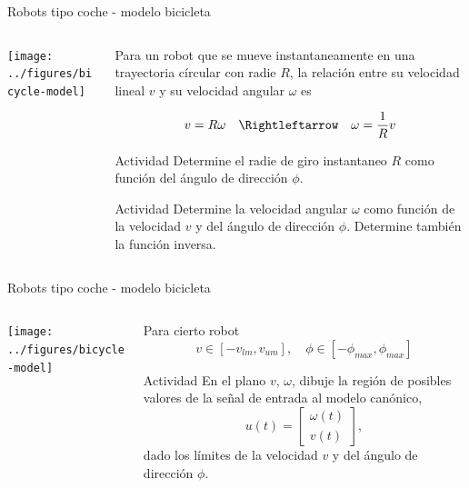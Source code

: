 \documentclass[presentation,aspectratio=169]{beamer}
\begin{document}
\begin{frame}[label={sec:orgb0b4836}]{Robots tipo coche - modelo bicicleta}
\begin{columns}
\begin{column}{0.4\columnwidth}
\begin{center}
 \texttt{[image: ../figures/bicycle-model]}
\end{center}
\end{column}

\begin{column}{0.6\columnwidth}
\pause

Para un robot que se mueve instantaneamente en una trayectoria círcular con radie \(R\), la relación entre su velocidad lineal \(v\) y su velocidad angular \(\omega\) es

\pause

\[ v = R\omega \quad \Rightleftarrow \quad \omega = \frac{1}{R} v \]

\pause
\alert{Actividad} Determine el radie de giro instantaneo \(R\) como función del ángulo de dirección \(\phi\).

\pause
\alert{Actividad} Determine la velocidad angular \(\omega\) como función de la velocidad \(v\) y del ángulo de dirección \(\phi\). Determine también la función inversa.
\end{column}
\end{columns}
\end{frame}



\begin{frame}[label={sec:org7fbcf45}]{Robots tipo coche - modelo bicicleta}
\begin{columns}
\begin{column}{0.4\columnwidth}
\begin{center}
 \texttt{[image: ../figures/bicycle-model]}
\end{center}
\end{column}

\begin{column}{0.6\columnwidth}
Para cierto robot
\[ v \in [-v_{lm}, v_{um}], \quad \phi \in [-\phi_{max}, \phi_{max}]\]


\pause

\alert{Actividad} En el plano \(v,\, \omega\), dibuje la región de posibles valores de la señal de entrada al modelo canónico,
\[ u(t) = \begin{bmatrix} \omega(t)\\v(t) \end{bmatrix}, \]
dado los límites de la velocidad \(v\) y del ángulo de dirección \(\phi\).
\end{column}
\end{columns}
\end{frame}
\end{document}
